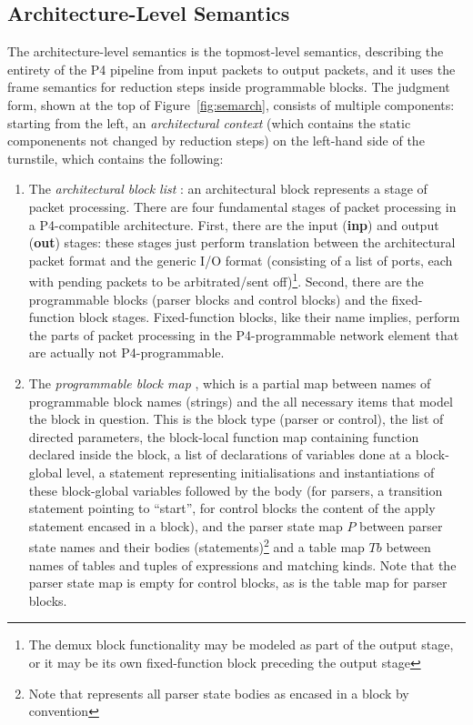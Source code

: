 \documentclass[UTF8]{article}
\begin{document}
\subsection{Architecture-Level Semantics}
The architecture-level semantics is the topmost-level semantics, describing the entirety of the P4 pipeline from input packets to output packets, and it uses the frame semantics for reduction steps inside programmable blocks. The judgment form, shown at the top of Figure~\ref{fig:semarch}, consists of multiple components: starting from the left, an \emph{architectural context} \actx{} (which contains the static componenents not changed by reduction steps) on the left-hand side of the turnstile, which contains the following:
\begin{enumerate}
\item The \emph{architectural block list} \abl{}: an architectural block represents a stage of packet processing. There are four fundamental stages of packet processing in a P4-compatible architecture. First, there are the input (\textbf{inp}) and output (\textbf{out}) stages: these stages just perform translation between the architectural packet format and the generic I/O format (consisting of a list of ports, each with pending packets to be arbitrated/sent off)\footnote{The demux block functionality may be modeled as part of the output stage, or it may be its own fixed-function block preceding the output stage}. Second, there are the programmable blocks (parser blocks and control blocks) and the fixed-function block stages. Fixed-function blocks, like their name implies, perform the parts of packet processing in the P4-programmable network element that are actually not P4-programmable.
\item The \emph{programmable block map} \pbm{}, which is a partial map between names of programmable block names (strings) and the all necessary items that model the block in question. This is the block type (parser or control), the list of directed parameters, the block-local function map containing function declared inside the block, a list of declarations of variables done at a block-global level, a statement representing initialisations and instantiations of these block-global variables followed by the body (for parsers, a transition statement pointing to ``start'', for control blocks the content of the apply statement encased in a block), and the parser state map $P$ between parser state names and their bodies (statements)\footnote{Note that \pfott{} represents all parser state bodies as encased in a block by convention} and a table map $\mathit{Tb}$ between names of tables and tuples of expressions and matching kinds. Note that the parser state map is empty for control blocks, as is the table map for parser blocks.

\end{enumerate}
\end{document}

